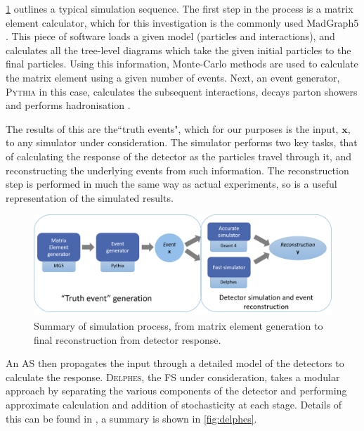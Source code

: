 \documentclass[twocolumn,twoside]{article}
\newcommand{\pkg}[1]{\textsc{#1}}
\begin{document}
\cref{fig:simdiag} outlines a typical simulation sequence. The first step in the process is a matrix element calculator, which for this investigation is the commonly used MadGraph5 \cite{madgraph}. This piece of software loads a given model (particles and interactions), and calculates all the tree-level diagrams which take the given initial particles to the final particles. Using this information, Monte-Carlo methods are used to calculate the matrix element using a given number of events. Next, an event generator, \pkg{Pythia} in this case, calculates the subsequent interactions, decays parton showers and performs hadronisation \cite{Gieseke2012}.

The results of this are the``truth events", which for our purposes is the input, $\mathbf{x}$, to any simulator under consideration. The simulator performs two key tasks, that of calculating the response of the detector as the particles travel through it, and reconstructing the underlying events from such information. The reconstruction step is performed in much the same way as actual experiments, so is a useful representation of the simulated results.        

\begin{figure}[H]
	\centering
	\includegraphics[width=0.8\linewidth]{simdiag}
	
	\caption{Summary of simulation process, from matrix element generation to final reconstruction from detector response.}
	\label{fig:simdiag}
	
\end{figure}	


An AS then propagates the input through a detailed model of the detectors to calculate the response. \pkg{Delphes}, the FS under consideration, takes a modular approach by separating the various components of the detector and performing approximate calculation and addition of stochasticity at each stage. Details of this can be found in \cite{delphes}, a summary is shown in \cref{fig:delphes}.
\end{document}
